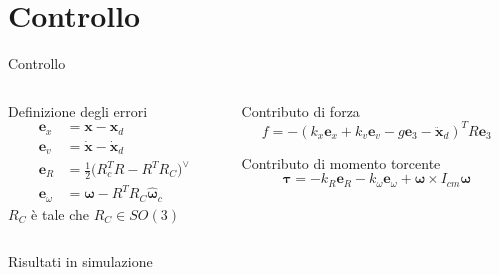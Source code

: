 \documentclass[]{beamer}
\begin{document}
	
	\section{Controllo}
	
	\begin{frame}{Controllo}
		\centering
		\begin{columns}
			\begin{column}{.45\textwidth}
				\setlength\abovedisplayskip{-10pt}
				\centering
				\begin{block}{Definizione degli errori}
					\begin{align*}
						\mathbf{e}_x &= \mathbf{x} - \mathbf{x}_d \\ 
						\mathbf{e}_v &= \dot{\mathbf{x}} - \dot{\mathbf{x}}_d \\
						\mathbf{e}_R &= \frac{1}{2}\bigl(R_c^TR-R^TR_C \bigl)^{\vee} \\
						\mathbf{e}_{\omega} &= \boldsymbol{\omega} - R^TR_C\hat{\boldsymbol{\omega}}_c
					\end{align*}
					$R_C$ è tale che $R_C \in SO(3)$
				\end{block}
			\end{column}
			\begin{column}{.55\textwidth}
				\centering
				\begin{block}{Contributo di forza}
					\setlength\abovedisplayskip{-10pt}
					\begin{equation*}
						f = -(k_x\mathbf{e}_x+k_v\mathbf{e}_v-g\mathbf{e}_3-\ddot{\mathbf{x}}_d)^TR\mathbf{e}_3
					\end{equation*}
				\end{block}
				\begin{block}{Contributo di momento torcente}
					\setlength\abovedisplayskip{-10pt}
					\begin{equation*}
						\boldsymbol{\tau} = -k_R\mathbf{e}_R - k_{\omega}\boldsymbol{e}_{\omega} + \boldsymbol{\omega}\times I_{cm}\boldsymbol{\omega}
					\end{equation*}
				\end{block}
			\end{column}
		\end{columns}
		\begin{figure}
			
		\end{figure}
	\end{frame}
	
	\begin{frame}{Risultati in simulazione}
		\centering
		\begin{figure}
			
		\end{figure}
	\end{frame}
	
\end{document}
